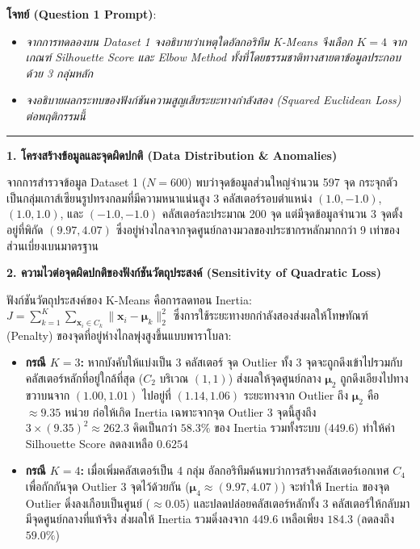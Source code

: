 \documentclass[12pt,a4paper]{article}
\begin{document}
\begin{ansbox}[unbreakable, fontupper={\fontsize{9.8pt}{13.0pt}\selectfont}, left=6pt, right=6pt, top=3pt, bottom=3pt]
\textbf{โจทย์ (Question 1 Prompt)}:
\begin{itemize}[leftmargin=1.2em, itemsep=0pt, topsep=0pt, parsep=0pt]
    \item[(a)] \textit{จากการทดลองบน Dataset 1 จงอธิบายว่าเหตุใดอัลกอริทึม K-Means จึงเลือก $K=4$ จากเกณฑ์ Silhouette Score และ Elbow Method ทั้งที่โดยธรรมชาติทางสายตาข้อมูลประกอบด้วย 3 กลุ่มหลัก}
    \item[(b)] \textit{จงอธิบายผลกระทบของฟังก์ชันความสูญเสียระยะทางกำลังสอง (Squared Euclidean Loss) ต่อพฤติกรรมนี้}
\end{itemize}

\vspace{-0.2em}
\noindent\rule{\linewidth}{0.4pt}
\vspace{-0.2em}

\noindent\textbf{\normalsize 1. โครงสร้างข้อมูลและจุดผิดปกติ (Data Distribution \& Anomalies)}\par\vspace{0.05em}
จากการสำรวจข้อมูล Dataset 1 ($N=600$) พบว่าจุดข้อมูลส่วนใหญ่จำนวน 597 จุด กระจุกตัวเป็นกลุ่มเกาส์เซียนรูปทรงกลมที่มีความหนาแน่นสูง 3 คลัสเตอร์รอบตำแหน่ง $(1.0, -1.0)$, $(1.0, 1.0)$, และ $(-1.0, -1.0)$ คลัสเตอร์ละประมาณ 200 จุด แต่มีจุดข้อมูลจำนวน 3 จุดตั้งอยู่ที่พิกัด $(9.97, 4.07)$ ซึ่งอยู่ห่างไกลจากจุดศูนย์กลางมวลของประชากรหลักมากกว่า 9 เท่าของส่วนเบี่ยงเบนมาตรฐาน

\vspace{0.15em}
\noindent\textbf{\normalsize 2. ความไวต่อจุดผิดปกติของฟังก์ชันวัตถุประสงค์ (Sensitivity of Quadratic Loss)}\par\vspace{0.05em}
ฟังก์ชันวัตถุประสงค์ของ K-Means คือการลดทอน Inertia: $J = \sum_{k=1}^K \sum_{\mathbf{x}_i \in C_k} \|\mathbf{x}_i - \boldsymbol{\mu}_k\|_2^2$ ซึ่งการใช้ระยะทางยกกำลังสองส่งผลให้โทษทัณฑ์ (Penalty) ของจุดที่อยู่ห่างไกลพุ่งสูงขึ้นแบบพาราโบลา:
\begin{itemize}[leftmargin=1.2em, itemsep=0.5pt, topsep=0.5pt]
    \item \textbf{กรณี $K=3$:} หากบังคับให้แบ่งเป็น 3 คลัสเตอร์ จุด Outlier ทั้ง 3 จุดจะถูกดึงเข้าไปรวมกับคลัสเตอร์หลักที่อยู่ใกล้ที่สุด ($C_2$ บริเวณ $(1, 1)$) ส่งผลให้จุดศูนย์กลาง $\boldsymbol{\mu}_2$ ถูกดึงเอียงไปทางขวาบนจาก $(1.00, 1.01)$ ไปอยู่ที่ $(1.14, 1.06)$ ระยะทางจาก Outlier ถึง $\boldsymbol{\mu}_2$ คือ $\approx 9.35$ หน่วย ก่อให้เกิด Inertia เฉพาะจากจุด Outlier 3 จุดนี้สูงถึง $3 \times (9.35)^2 \approx 262.3$ คิดเป็นกว่า $58.3\%$ ของ Inertia รวมทั้งระบบ ($449.6$) ทำให้ค่า Silhouette Score ลดลงเหลือ $0.6254$
    \item \textbf{กรณี $K=4$:} เมื่อเพิ่มคลัสเตอร์เป็น 4 กลุ่ม อัลกอริทึมค้นพบว่าการสร้างคลัสเตอร์เอกเทศ $C_4$ เพื่อกักกันจุด Outlier 3 จุดไว้ด้วยกัน ($\boldsymbol{\mu}_4 \approx (9.97, 4.07)$) จะทำให้ Inertia ของจุด Outlier ดิ่งลงเกือบเป็นศูนย์ ($\approx 0.05$) และปลดปล่อยคลัสเตอร์หลักทั้ง 3 คลัสเตอร์ให้กลับมามีจุดศูนย์กลางที่แท้จริง ส่งผลให้ Inertia รวมดิ่งลงจาก $449.6$ เหลือเพียง $184.3$ (ลดลงถึง $59.0\%$)
\end{itemize}


\end{ansbox}
\end{document}
